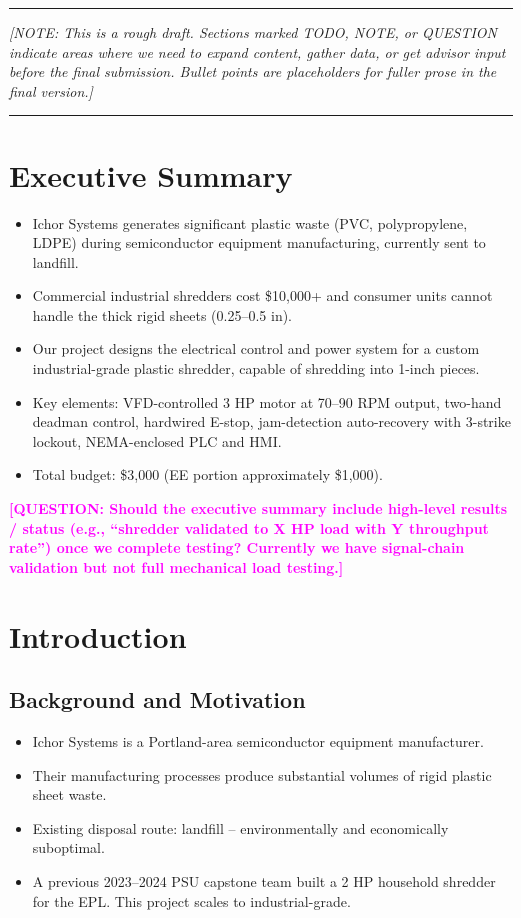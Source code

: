 \documentclass[hidelinks,12pt]{article}
\newcommand{\note}[1]{\textcolor{PSUblue}{\textit{[NOTE: #1]}}}
\newcommand{\question}[1]{\textcolor{magenta}{\textbf{[QUESTION: #1]}}}
\begin{document}
\noindent\rule{\textwidth}{0.4pt}

\note{This is a rough draft. Sections marked TODO, NOTE, or QUESTION indicate areas where we need to expand content, gather data, or get advisor input before the final submission. Bullet points are placeholders for fuller prose in the final version.}

\noindent\rule{\textwidth}{0.4pt}

\tableofcontents
\newpage

\section{Executive Summary}

\begin{itemize}
    \item Ichor Systems generates significant plastic waste (PVC, polypropylene, LDPE) during semiconductor equipment manufacturing, currently sent to landfill.
    \item Commercial industrial shredders cost \$10,000+ and consumer units cannot handle the thick rigid sheets (0.25--0.5 in).
    \item Our project designs the electrical control and power system for a custom industrial-grade plastic shredder, capable of shredding into 1-inch pieces.
    \item Key elements: VFD-controlled 3 HP motor at 70--90 RPM output, two-hand deadman control, hardwired E-stop, jam-detection auto-recovery with 3-strike lockout, NEMA-enclosed PLC and HMI.
    \item Total budget: \$3,000 (EE portion approximately \$1,000).
\end{itemize}

\question{Should the executive summary include high-level results / status (e.g., ``shredder validated to X HP load with Y throughput rate'') once we complete testing? Currently we have signal-chain validation but not full mechanical load testing.}

\section{Introduction}

\subsection{Background and Motivation}
\begin{itemize}
    \item Ichor Systems is a Portland-area semiconductor equipment manufacturer.
    \item Their manufacturing processes produce substantial volumes of rigid plastic sheet waste.
    \item Existing disposal route: landfill -- environmentally and economically suboptimal.
    \item A previous 2023--2024 PSU capstone team built a 2 HP household shredder for the EPL. This project scales to industrial-grade.
\end{itemize}
\end{document}
